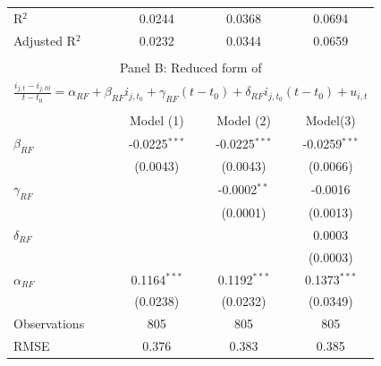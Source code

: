 \documentclass[]{amsart}
\begin{document}
\begin{table}[htb]
{\begin{tabular}{lccc}
R$^{2}$ & \multicolumn{1}{c}{0.0244} & \multicolumn{1}{c}{0.0368} & \multicolumn{1}{c}{0.0694} \\ 

Adjusted R$^{2}$ & \multicolumn{1}{c}{0.0232} & \multicolumn{1}{c}{0.0344} & \multicolumn{1}{c}{0.0659} \\ 
  \bottomrule
    \toprule
    \multicolumn{4}{c}{} \\    
    \multicolumn{4}{c}{Panel B: Reduced form of \cite{barro1992convergence}} \\   
    \multicolumn{4}{c}{$\frac{i_{j,t}-i_{j,t0}}{t-t_0}  = \alpha_{RF} +\beta_{RF} i_{j,t_0}+\gamma_{RF} (t-t_0) +\delta_{RF} i_{j,t_0}(t-t_0)+u_{i, t}$} \\
    \multicolumn{4}{c}{} \\

    \midrule



& Model (1) & Model (2) & Model(3)  \\ 
\hline 

$\beta_{RF}$ & \multicolumn{1}{c}{-0.0225$^{***}$} & \multicolumn{1}{c}{-0.0225$^{***}$} & \multicolumn{1}{c}{-0.0259$^{***}$}  \\ 

  & \multicolumn{1}{c}{(0.0043)} & \multicolumn{1}{c}{(0.0043)}  & \multicolumn{1}{c}{(0.0066)}  \\ 

$\gamma_{RF}$ &  & \multicolumn{1}{c}{-0.0002$^{**}$} & \multicolumn{1}{c}{-0.0016}  \\ 

  & & \multicolumn{1}{c}{(0.0001)} &\multicolumn{1}{c}{(0.0013)} \\ 
  
$\delta_{RF}$ &  &  & \multicolumn{1}{c}{0.0003}  \\ 
  &  &   & \multicolumn{1}{c}{(0.0003)}  \\ 
  
{$\alpha_{RF}$} & \multicolumn{1}{c}{0.1164$^{***}$} & \multicolumn{1}{c}{0.1192$^{***}$} & \multicolumn{1}{c}{0.1373$^{***}$}  \\
 
  & \multicolumn{1}{c}{(0.0238)} & \multicolumn{1}{c}{(0.0232)} & \multicolumn{1}{c}{(0.0349)} \\ 
\hline 

Observations & \multicolumn{1}{c}{805} & \multicolumn{1}{c}{805}  & \multicolumn{1}{c}{805} \\ 

RMSE & \multicolumn{1}{c}{0.376} & \multicolumn{1}{c}{0.383} & \multicolumn{1}{c}{0.385} \\ 


\end{tabular}}
\end{table}
\end{document}
